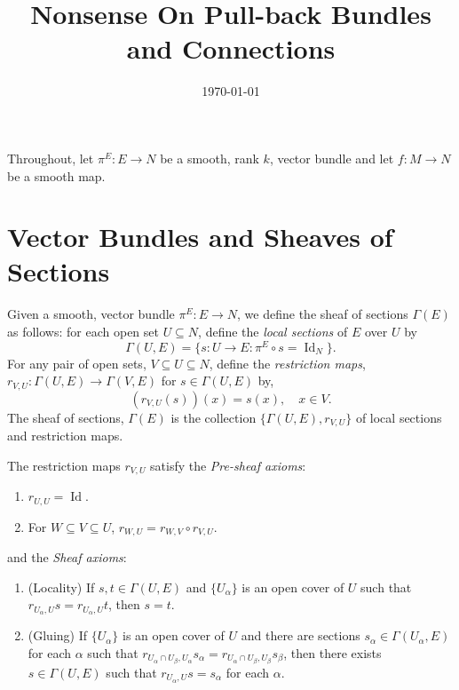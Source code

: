 \documentclass{amsart}
\begin{document}
\title[Pull-back Bundle Nonsense]
 {Nonsense On Pull-back Bundles and Connections}

\curraddr{}
\email{}
\date{\today}

\dedicatory{}
\subjclass[2010]{}
\keywords{}

\maketitle

Throughout, let \(\pi^E : E \to N\) be a smooth, rank \(k\), vector bundle and let \(f : M \to N\) be a smooth map.

\section{Vector Bundles and Sheaves of Sections}

\begin{defn}
Given a smooth, vector bundle \(\pi^E : E \to N\), we define the sheaf of sections \(\Gamma(E)\) as follows: for each open set \(U \subseteq N\), define the \emph{local sections} of \(E\) over \(U\) by
\[
\Gamma(U, E) = \{s : U \to E : \pi^E \circ s = \operatorname{Id}_N\}.
\]
For any pair of open sets, \(V \subseteq U \subseteq N\), define the \emph{restriction maps}, \(r_{V,U} : \Gamma(U, E) \to \Gamma(V, E)\) for \(s \in \Gamma(U, E)\) by,
\[
(r_{V,U} (s)) (x) = s(x), \quad x \in V.
\]
The sheaf of sections, \(\Gamma(E)\) is the collection \(\{\Gamma(U, E), r_{V,U}\}\) of local sections and restriction maps.
\end{defn}

\begin{rem}
The restriction maps \(r_{V,U}\) satisfy the \emph{Pre-sheaf axioms}:
\begin{enumerate}
\item \(r_{U,U} = \operatorname{Id}\).
\item For \(W \subseteq V \subseteq U\), \(r_{W,U} = r_{W,V} \circ r_{V,U}\).
\end{enumerate}
and the \emph{Sheaf axioms}:
\begin{enumerate}
\item (Locality) If \(s, t \in \Gamma(U, E)\) and \(\{U_{\alpha}\}\) is an open cover of \(U\) such that \(r_{U_{\alpha},U} s = r_{U_{\alpha},U} t\), then \(s = t\).
\item (Gluing) If \(\{U_{\alpha}\}\) is an open cover of \(U\) and there are sections \(s_{\alpha} \in \Gamma(U_{\alpha}, E)\) for each \(\alpha\) such that \(r_{U_{\alpha} \cap U_{\beta},U_{\alpha}} s_{\alpha} = r_{U_{\alpha} \cap U_{\beta},U_{\beta}} s_{\beta}\), then there exists \(s \in \Gamma(U, E)\) such that \(r_{U_{\alpha},U} s = s_{\alpha}\) for each \(\alpha\).
\end{enumerate}
\end{rem}
\end{document}
